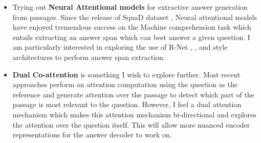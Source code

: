 \documentclass{article}
\begin{document}
\begin{itemize}
    \item Trying out \textbf{Neural Attentional models} for extractive answer generation from passages. Since the release of SquaD dataset \cite{squad}, Neural attentional models have enjoyed tremendous success on the Machine comprehension task which entails extracting an answer span which can best answer a given question. I am particularly interested in exploring the use of R-Net \cite{Rnet}, \cite{Reasonet}, \cite{bidaf} and \cite{DCN} style architectures to perform answer span extraction.
    \item \textbf{Dual Co-attention} is something I wish to explore further. Most recent approaches perform an attention computation using the question as the reference and generate attention over the passage to detect which part of the passage is most relevant to the question. However, I feel a dual attention mechanism which makes this attention mechanism bi-directional and explores the attention over the question itself. This will allow more nuanced encoder representations for the answer decoder to work on.


\end{itemize}
\end{document}
